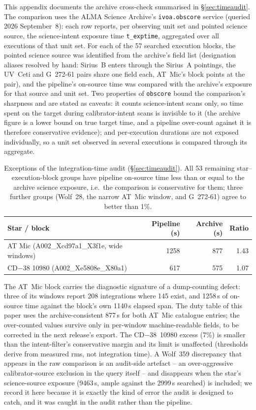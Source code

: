 \documentclass{openjournal}
\begin{document}
This appendix documents the archive cross-check summarised in
\S\ref{sec:timeaudit}. The comparison uses the ALMA Science Archive's
\texttt{ivoa.obscore} service (queried 2026 September~8): each row
reports, per observing unit set and pointed science source, the
science-intent exposure time \texttt{t\_exptime}, aggregated over all
executions of that unit set. For each of the 57 searched execution
blocks, the pointed science source was identified from the archive's
field list (designation aliases resolved by hand: Sirius~B enters
through the Sirius~A pointings, the UV~Ceti and G~272-61 pairs share
one field each, AT~Mic's block points at the pair), and the pipeline's
on-source time was compared with the archive's exposure for that
source and unit set. Two properties of \texttt{obscore} bound the
comparison's sharpness and are stated as caveats: it counts
science-intent scans only, so time spent on the target during
calibrator-intent scans is invisible to it (the archive figure is a
lower bound on true target time, and a pipeline over-count against it
is therefore conservative evidence); and per-execution durations are
not exposed individually, so a unit set observed in several executions
is compared through its aggregate.

\begin{table}
\centering
\small
\caption{Exceptions of the integration-time audit
(\S\ref{sec:timeaudit}). All 53 remaining star--execution-block
groups have pipeline on-source time less than or equal to the archive
science exposure, i.e.\ the comparison is conservative for them;
three further groups (Wolf~28, the narrow AT~Mic window, and
G~272-61) agree to better than 1\%.}
\label{tab:audit}
\begin{tabular}{@{}lrrr@{}}
\hline
Star / block & Pipeline (s) & Archive (s) & Ratio \\
\hline
AT Mic (A002\_Xcd97a1\_X3f1e, wide windows) & 1258 & 877 & 1.43 \\
CD$-$38 10980 (A002\_Xe5808e\_X80a1) & 617 & 575 & 1.07 \\
\hline
\end{tabular}
\end{table}

The AT~Mic block carries the diagnostic signature of a dump-counting
defect: three of its windows report 208 integrations where 145 exist,
and 1258\,s of on-source time against the block's own 1140\,s elapsed
span. The duty table of this paper uses the archive-consistent 877\,s
for both AT~Mic catalogue entries; the over-counted values survive
only in per-window machine-readable fields, to be corrected in the
next release's export. The CD$-$38~10980 excess (7\%) is smaller than
the intent-filter's conservative margin and its limit is unaffected
(thresholds derive from measured rms, not integration time). A
Wolf~359 discrepancy that appears in the raw comparison is an
audit-side artefact -- an over-aggressive calibrator-source exclusion
in the query itself -- and disappears when the star's science-source
exposure (9463\,s, ample against the 2999\,s searched) is included;
we record it here because it is exactly the kind of error the audit
is designed to catch, and it was caught in the audit rather than the
pipeline.
\end{document}
